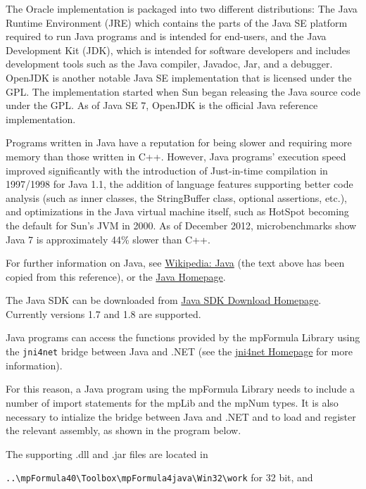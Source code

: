 \vpara
The Oracle implementation is packaged into two different distributions: The Java Runtime Environment (JRE) which contains the parts of the Java SE platform required to run Java programs and is intended for end-users, and the Java Development Kit (JDK), which is intended for software developers and includes development tools such as the Java compiler, Javadoc, Jar, and a debugger. OpenJDK is another notable Java SE implementation that is licensed under the GPL. The implementation started when Sun began releasing the Java source code under the GPL. As of Java SE 7, OpenJDK is the official Java reference implementation.

\vpara
Programs written in Java have a reputation for being slower and requiring more memory than those written in C++. However, Java programs' execution speed improved significantly with the introduction of Just-in-time compilation in 1997/1998 for Java 1.1, the addition of language features supporting better code analysis (such as inner classes, the StringBuffer class, optional assertions, etc.), and optimizations in the Java virtual machine itself, such as HotSpot becoming the default for Sun's JVM in 2000. As of December 2012, microbenchmarks show Java 7 is approximately 44\% slower than C++. 

\vpara
For further information on Java, see \href{http://en.wikipedia.org/wiki/Java_(programming_language)}{Wikipedia: Java} (the text above has been copied from this reference), or the  \href{http://www.java.com/en/}{Java Homepage}.

\vpara
The Java SDK can be downloaded from \href{http://www.oracle.com/technetwork/java/javase/downloads/index.html}{Java SDK Download Homepage}. Currently versions 1.7 and 1.8 are supported. 

Java programs can access the functions provided by the mpFormula Library using the \verb|jni4net| bridge between Java and .NET (see the \href{http://jni4net.sourceforge.net/index.shtml}{jni4net Homepage} for more information). 

For this reason, a Java program using the mpFormula Library needs to include a number of import statements for the mpLib and the mpNum types. It is also necessary to intialize the bridge between Java and .NET and to load and register the relevant assembly, as shown in the program below.

\vpara
The supporting .dll and .jar files are located in 

\verb|..\mpFormula40\Toolbox\mpFormula4java\Win32\work| for 32 bit, and 

